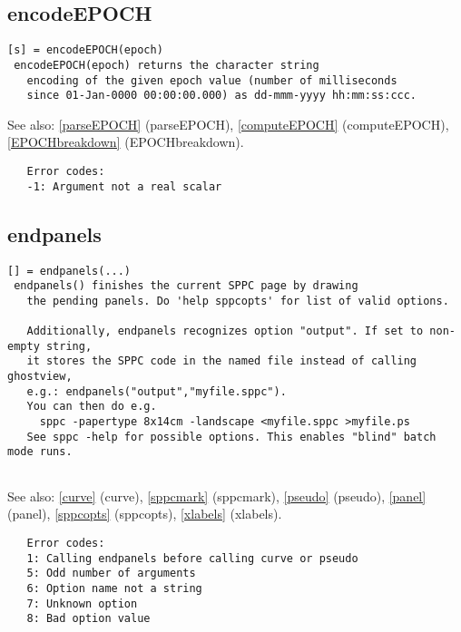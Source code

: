 \documentclass[a4paper]{article}
\begin{document}
\subsection{encodeEPOCH\label{encodeEPOCH}}

\begin{tscreen}
\begin{verbatim}
[s] = encodeEPOCH(epoch)
 encodeEPOCH(epoch) returns the character string
   encoding of the given epoch value (number of milliseconds
   since 01-Jan-0000 00:00:00.000) as dd-mmm-yyyy hh:mm:ss:ccc.
\end{verbatim}

See also: \ref{parseEPOCH} {(parseEPOCH)}, \ref{computeEPOCH} {(computeEPOCH)}, \ref{EPOCHbreakdown} {(EPOCHbreakdown)}.
\begin{verbatim}
   Error codes:
   -1: Argument not a real scalar
\end{verbatim}
\end{tscreen}





\subsection{endpanels\label{endpanels}}

\begin{tscreen}
\begin{verbatim}
[] = endpanels(...)
 endpanels() finishes the current SPPC page by drawing
   the pending panels. Do 'help sppcopts' for list of valid options.
   
   Additionally, endpanels recognizes option "output". If set to non-empty string,
   it stores the SPPC code in the named file instead of calling ghostview,
   e.g.: endpanels("output","myfile.sppc").
   You can then do e.g.
     sppc -papertype 8x14cm -landscape <myfile.sppc >myfile.ps
   See sppc -help for possible options. This enables "blind" batch mode runs.
   
\end{verbatim}

See also: \ref{curve} {(curve)}, \ref{sppcmark} {(sppcmark)}, \ref{pseudo} {(pseudo)}, \ref{panel} {(panel)}, \ref{sppcopts} {(sppcopts)}, \ref{xlabels} {(xlabels)}.
\begin{verbatim}
   Error codes:
   1: Calling endpanels before calling curve or pseudo
   5: Odd number of arguments
   6: Option name not a string
   7: Unknown option
   8: Bad option value
\end{verbatim}
\end{tscreen}
\end{document}
